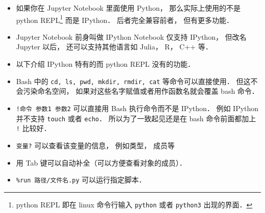
\begin{issues}
\issueDraft
\end{issues}

\begin{itemize}
\item 如果你在 Jupyter Notebook 里面使用 Python， 那么实际上使用的不是 python REPL\footnote{python REPL 即在 linux 命令行输入 \verb|python| 或者 \verb|python3| 出现的界面．} 而是 IPython． 后者完全兼容前者， 但有更多功能．
\item Jupyter Notebook 前身叫做 IPython Notebook 仅支持 IPython， 但改名 Jupyter 以后， 还可以支持其他语言如 Julia， R， C++ 等．
\item 以下介绍 IPython 特有的而 python REPL 没有的功能．
\item Bash 中的 \verb|cd, ls, pwd, mkdir, rmdir, cat| 等命令可以直接使用． 但这不会污染命名空间， 如果对这些名字赋值或者用作函数名就会覆盖 bash 命令．
\item \verb|!命令 参数1 参数2| 可以直接用 Bash 执行命令而不是 IPython． 例如 IPython 并不支持 \verb|touch| 或者 \verb|echo|． 所以为了一致起见还是在 bash 命令前面都加上 \verb|!| 比较好．
\item \verb|变量?| 可以查看该变量的信息， 例如类型， 成员等
\item 用 Tab 键可以自动补全（可以方便查看对象的成员）．
\item \verb|%run 路径/文件名.py| 可以运行指定脚本．
\end{itemize}
